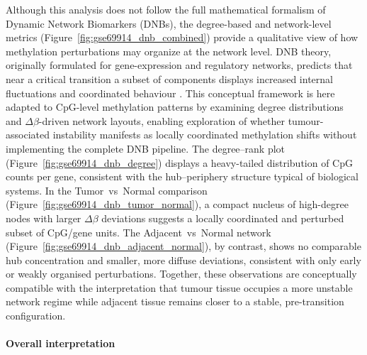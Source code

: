 Although this analysis does not follow the full mathematical formalism of
Dynamic Network Biomarkers (DNBs), the degree-based and network-level metrics
(Figure~\ref{fig:gse69914_dnb_combined}) provide a qualitative view of how
methylation perturbations may organize at the network level.
DNB theory, originally formulated for gene-expression and regulatory networks,
predicts that near a critical transition a subset of components displays
increased internal fluctuations and coordinated behaviour
\cite{chen2012dnb, west2018entropy, liu2022lne}. This conceptual framework is
here adapted to CpG-level methylation patterns by examining degree distributions
and $\Delta\beta$-driven network layouts, enabling exploration of whether
tumour-associated instability manifests as locally coordinated methylation shifts
without implementing the complete DNB pipeline.
The degree--rank plot (Figure~\ref{fig:gse69914_dnb_degree}) displays a
heavy-tailed distribution of CpG counts per gene, consistent with the
hub--periphery structure typical of biological systems.
In the Tumor~vs~Normal comparison (Figure~\ref{fig:gse69914_dnb_tumor_normal}),
a compact nucleus of high-degree nodes with larger $\Delta\beta$ deviations
suggests a locally coordinated and perturbed subset of CpG/gene units.
The Adjacent~vs~Normal network (Figure~\ref{fig:gse69914_dnb_adjacent_normal}),
by contrast, shows no comparable hub concentration and smaller, more diffuse
deviations, consistent with only early or weakly organised perturbations.
Together, these observations are conceptually compatible with the interpretation
that tumour tissue occupies a more unstable network regime while adjacent tissue
remains closer to a stable, pre-transition configuration.


\paragraph{Overall interpretation}

